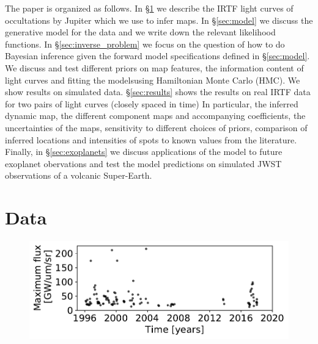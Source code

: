 \documentclass[modern]{aastex62}
\begin{document}
The paper is organized as follows.
In \S\ref{sec:data} we describe the IRTF light curves of occultations by Jupiter which we use to infer maps.
In \S\ref{sec:model} we discuss the generative model for the data and we write down the relevant likelihood functions.
In \S\ref{sec:inverse_problem} we focus on the question of how to do Bayesian inference given the forward model specifications defined in \S\ref{sec:model}.
We discuss and test different priors on map features, the information content of light curves and fitting the modelsusing Hamiltonian Monte Carlo (HMC). 
We show results on simulated data.
\S\ref{sec:results} shows the results on real IRTF data for two pairs of light curves (closely spaced in time)
In particular, the inferred dynamic map, the  different component maps and accompanying coefficients, the uncertainties of the maps, sensitivity to different choices of priors, comparison of inferred locations and intensities of spots to known values from the literature.
Finally, in \S\ref{sec:exoplanets} we discuss applications of the model to future exoplanet obervations and test the model predictions on simulated JWST observations of a volcanic Super-Earth.

\section{Data}
\label{sec:data}

\begin{figure}[h!]
    \begin{centering}
    \includegraphics[width=0.5\linewidth]{figures/irtf_max_flux.pdf}
    \end{centering}
\end{figure}
\end{document}
